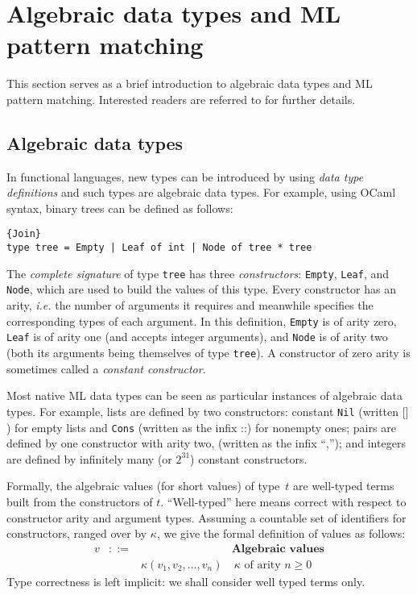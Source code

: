 \documentclass{LMCS}
\makeatletter
\let \lst \lstinline
\newcommand{\pair}[2]{#1\mathord{\texttt{,}}#2}
\newcommand{\const}{\kappa}
\newcommand{\ie}{\emph{i.e.}\@\xspace}
\newcommand{\ocaml}{\textrm{OCaml}\xspace}
\newcommand{\cons}[2]{#1\mathord{\texttt{::}}#2}
\newcommand{\nil}{\texttt{[]}}
\renewcommand{\_}{\mathord{\rule[-.25ex]{1ex}{.15ex}}}
\newcommand{\appnv}[4]{{#1}(#2, #3, \ldots{} , #4)}
\makeatother
\begin{document}
\section{Algebraic data types and ML pattern matching}
\label{sec.pt}

This section serves as a brief introduction to algebraic data types
and ML pattern matching. Interested readers are referred to
\cite{warning,LefessantMarangetPattern} for further details.

\subsection{Algebraic data types}
\label{subsec.pt}

In functional languages, new types can be introduced by using
\emph{data type definitions} and such types are algebraic
data types.
For example, using \ocaml syntax, binary trees can be defined as follows:
\begin{lstlisting}{Join}
type tree = Empty | Leaf of int | Node of tree * tree
\end{lstlisting}
The \emph{complete signature} of type \lst"tree" has three
\emph{constructors}: \lst"Empty", \lst"Leaf", and \lst"Node", which
are used to build the values of this type. Every constructor has an
arity, \ie the number of arguments it requires and meanwhile specifies
the corresponding types of each argument. In this definition,
\lst"Empty" is of arity zero, \lst"Leaf" is of arity one (and accepts
integer arguments),
and \lst"Node" is of arity two (both its arguments being themselves of
type \lst"tree"). A constructor of zero arity is sometimes called a
\emph{constant constructor}.

Most native ML data types can be seen as particular instances of
algebraic data types. For example, lists are defined by two
constructors: constant \lst"Nil" (written $\nil$) for empty
lists and \lst"Cons" (written as the infix $\cons{}{}$) for
nonempty ones; pairs are defined by one constructor with arity two,
(written as the infix ``$\pair{}{}$''); and integers
are defined by infinitely many (or $2^{31}$) constant constructors.


Formally, the algebraic values (for short values) of type~$t$ are well-typed terms built from the constructors of $t$.
``Well-typed'' here means correct with respect to constructor arity
and argument types.
Assuming a countable set of identifiers for constructors,
ranged over by $\const$, we give the formal definition of values as
follows:
$$
\begin{array}{rcll}
  v &::=& &  \textbf{Algebraic values}\\
  && \appnv{\const}{v_1}{v_2}{v_n} & \ \textrm{$\const$ of arity $n\geq 0$} 
\end{array}
$$
Type correctness is left implicit: we shall consider well typed terms
only.
\end{document}
